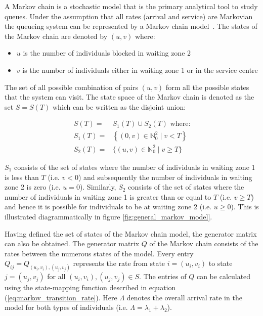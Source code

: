 A Markov chain is a stochastic model that is the primary analytical tool to 
study queues.
Under the assumption that all rates (arrival and service) are Markovian the
queueing system can be represented by a Markov chain
model~\cite{kemeny1976markov}.
The states of the Markov chain are denoted by \((u,v)\) where:

\begin{itemize}
    \item \(u\) is the number of individuals blocked in waiting zone 2
    \item \(v\) is the number of individuals either in waiting zone 1 or in the
    service centre
\end{itemize}

The set of all possible combination of pairs \((u, v)\) form all the possible 
states that the system can visit.
The state space of the Markov chain is denoted as the set \(S=S(T)\) which can
be written as the disjoint union:

\begin{align}
    S(T) =& S_1(T) \cup S_2(T) \text{ where:} \nonumber \\
    S_1(T) =& \left\{(0, v)\in\mathbb{N}_0^2 \; | \; v < T \right\}
    \label{eq:definition_of_S_as_disjoint_union} \\
    S_2(T) =& \{(u, v)\in\mathbb{N}_0^2 \; | \; v \geq T \} \nonumber
\end{align}

\(S_1\) consists of the set of states where the number of individuals in waiting
zone 1 is less than \(T\) (i.e. \(v < 0\)) and subsequently the number of
individuals in waiting zone 2 is zero (i.e. \(u = 0\)).
Similarly, \(S_2\) consists of the set of states where the number of individuals
in waiting zone 1 is greater than or equal to \(T\) (i.e. \(v \geq T\)) and 
hence it is possible for individuals to be at waiting zone 2 (i.e. 
\(u \geq 0\)).
This is illustrated diagrammatically in figure \ref{fig:general_markov_model}.

Having defined the set of states of the Markov chain model, the generator
matrix can also be obtained.
The generator matrix \(Q\) of the Markov chain consists of the
rates between the numerous states of the model.
Every entry \( Q_{ij} = Q_{(u_i, v_i),(u_j, v_j)} \) represents the rate from
state \( i = (u_i, v_i) \) to state \( j = (u_j , v_j) \) for all
\( (u_i, v_i), (u_j, v_j) \in S \).
The entries of \(Q\) can be calculated using the state-mapping function
described in equation (\ref{eq:markov_transition_rate}).
Here \(\Lambda\) denotes the overall arrival rate in the model for
both types of individuals (i.e. \(\Lambda = \lambda_1 + \lambda_2\)).


